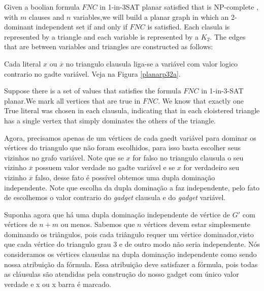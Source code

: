 \documentclass[a4paper,8pt]{article}
\theoremstyle{plain}
\begin{document}
Given a boolian formula $FNC$  in 1-in-3SAT planar satisfied that is NP-complete \cite{ueverton}, with $m$ clauses and $n$ variables,we will build a planar graph in which an 2-dominant independent set  if and only if $FNC$ is satisfied. Each clasula is represented by a triangle and each variable is represented by a $K_2$.  The edges that are between variables and triangles are constructed as follows: 

Cada literal $x$ ou $\overline{x}$ no triangulo clausula liga-se a variável com valor logico contrario no gadte variável. Veja na Figura
\ref{planarp32a}.

Suppose there is a set of values that satisfies the formula $FNC$ in 1-in-3-SAT planar.We mark all vertices that are true in $FNC$. We know that exactly one True literal was chosen in each clausula, indicating that in each cloistered triangle has a single vertex that simply dominates the others of the triangle.


 Agora, precisamos apenas de um vértices  de cada gaedt variável para dominar os vértices do triangulo que não foram escolhidos, para isso basta escolher seus vizinhos no grafo variável. Note que se $x$ for falso no triangulo clausula o seu vizinho $\overline{x}$ possuem valor verdade no gadte variável e se $x$ for verdadeiro seu vizinho  $\overline{x}$ falso, desse fato é possível obtemos uma dupla dominação independente. Note que escolha da dupla dominação a faz independente, pelo fato de escolhemos o valor contrario do \textit{gadget} clausula e do \textit{gadget} variável. 

Suponha agora que há uma dupla dominação independente  de vértice de $G'$ com vértices de $n + m$ ou menos. Sabemos que $n$ vértices devem estar simplesmente dominando os triângulos, pois cada triângulo requer um vértice dominador,visto que cada vértice do triangulo grau 3 e de outro modo não seria independente. Nós consideramos os vértices clausulas na dupla dominação independente como sendo nossa atribuição da fórmula. Essa atribuição deve satisfazer a fórmula, pois todas as cláusulas são atendidas pela construção do nosso gadget com único valor verdade e x ou x barra é marcado.
\end{document}
